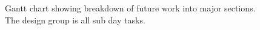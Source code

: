 \begin{figure}[tbh]
\caption{\protect\label{gantt}Gantt chart showing breakdown of future work into major sections. The design group is all sub day tasks.}
\end{figure}